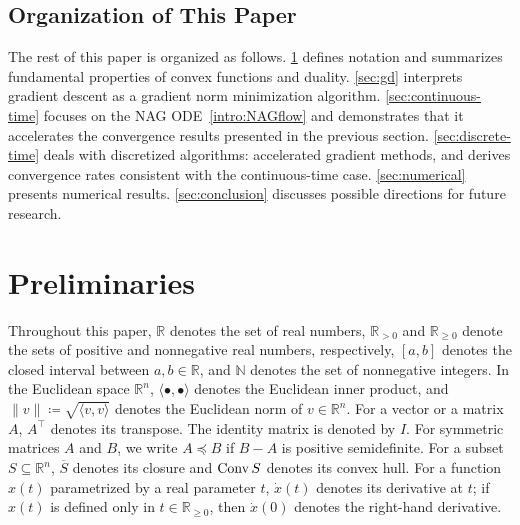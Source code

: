\documentclass[11pt,a4paper]{article}
\theoremstyle{definition}
\theoremstyle{plain}
\newcommand{\RR}{{\mathbb{R}}}
\newcommand{\NN}{{\mathbb{N}}}
\newcommand{\conv}{\mathop{\rm Conv}}
\begin{document}
\subsection{Organization of This Paper}
The rest of this paper is organized as follows.
\cref{sec:preliminaries} defines notation and summarizes fundamental properties of convex functions and duality.
\cref{sec:gd} interprets gradient descent as a gradient norm minimization algorithm.
\cref{sec:continuous-time} focuses on the NAG ODE~\eqref{intro:NAGflow} and demonstrates that it accelerates the convergence results presented in the previous section.
\cref{sec:discrete-time} deals with discretized algorithms: accelerated gradient methods, and derives convergence rates consistent with the continuous-time case.
\cref{sec:numerical} presents numerical results.
\cref{sec:conclusion} discusses possible directions for future research.

\section{Preliminaries}\label{sec:preliminaries}
Throughout this paper, $\RR$ denotes the set of real numbers, $\RR_{> 0}$ and $\RR_{\ge 0}$ denote the sets of positive and nonnegative real numbers, respectively, $[a, b]$ denotes the closed interval between $a, b \in \RR$, and $\NN$ denotes the set of nonnegative integers.
In the Euclidean space $\RR^n$, $\langle\bullet, \bullet\rangle$ denotes the Euclidean inner product, and $\|v\| \coloneqq \sqrt{\langle v, v\rangle}$ denotes the Euclidean norm of $v \in \RR^n$.
For a vector or a matrix $A$, $A^\top$ denotes its transpose.
The identity matrix is denoted by $I$.
For symmetric matrices $A$ and $B$, we write $A \preceq B$ if $B - A$ is positive semidefinite.
For a subset $S \subseteq \RR^n$, $\overline{S}$ denotes its closure and $\conv S$ denotes its convex hull.
For a function $x(t)$ parametrized by a real parameter $t$, $\dot x(t)$ denotes its derivative at $t$; if $x(t)$ is defined only in $t \in \RR_{\ge 0}$, then $\dot x(0)$ denotes the right-hand derivative.
\end{document}
